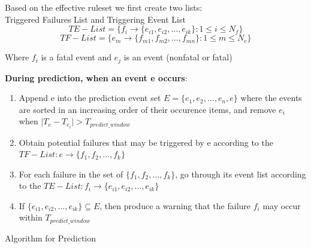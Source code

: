 \begin{algorithm}[b]
 \SetAlgoLined
Based on the effective ruleset we first create two lists: \\ Triggered Failures List and Triggering Event List\\


 \begin{equation}
 	TE-List=\{f_i\rightarrow\{e_{i1}, e_{i2},\dots, e_{ik}\}:1 \le i\le N_f\}
 \end{equation}
 \begin{equation}
 	TF-List=\{e_m\rightarrow\{f_{m1}, f_{m2},\dots, f_{mn}\}:1 \le m \le N_e\}
 \end{equation}

 Where \begin{math}f_i\end{math} is a fatal event and \begin{math}e_j\end{math} is an event (nonfatal or fatal)

\textbf{During prediction, when an event e occurs}:
\begin{enumerate}
\item Append e into the prediction event set \begin{math}E=\{e_1,e_2,\dots,e_n,e\}\end{math} where the events are sorted in an increasing order of their occurence items, and remove \begin{math}e_i\end{math} when \begin{math}\mid T_e-T_{e_i}\mid>T_{predict\_window}\end{math}

\item Obtain potential failures that may be triggered by e according to the \begin{math}TF-List:e\rightarrow\{f_1, f_2,\dots,f_k\}\end{math}

\item For each failure in the set of \begin{math}\{f_1, f_2,\dots,f_k\}\end{math}, go through its event list according to the \begin{math}TE-List:f_i\rightarrow\{e_{i1}, e_{i2},\dots,e_{ik}\}\end{math}

\item If \begin{math}\{e_{i1}, e_{i2},\dots,e_{ik}\}\subseteq E\end{math}, then produce a warning that the failure \begin{math}f_i\end{math} may occur within \begin{math}T_{predict\_window}\end{math}

\end{enumerate}
 

 \caption{Algorithm for Prediction}
\end{algorithm}

